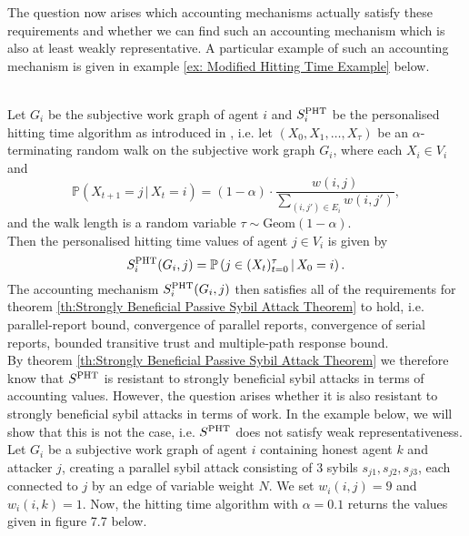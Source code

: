 \noindent{}The question now arises which accounting mechanisms actually satisfy these requirements and whether we can find such an accounting mechanism which is also at least weakly representative. A particular example of such an accounting mechanism is given in example \ref{ex: Modified Hitting Time Example} below.

\begin{example}[]\ \\
\label{ex: Modified Hitting Time Example}
\noindent{}Let $G_i$ be the subjective work graph of agent $i$ and $S^{\rm PHT}_i$ be the personalised hitting time algorithm as introduced in  \cite{Personalised Hitting Time}, i.e. let $(X_0,X_1,\ldots,X_{\tau})$ be an $\alpha$-terminating random walk on the subjective work graph $G_i$, where each $X_i\in{}V_i$ and 
\[
\mathbb{P}\left(X_{t+1}=j\,|\,X_t=i\right) = \left(1-\alpha\right)\cdot\frac{w(i,j)}{\sum\limits_{(i,j')\in{}E_i}w(i,j')},
\]
\noindent{}and the walk length is a random variable $\tau\sim$Geom$(1-\alpha)$. \vspace{1em}\\

\noindent{}Then the personalised hitting time values of agent $j\in{}V_i$ is given by 
\[
S^{\rm PHT}_i(G_i,j) = \mathbb{P}\left(j\in{}(X_t)_{t=0}^{\tau}\,|\,X_0=i\right).\vspace{1em}\\
\] 
\noindent{}The accounting mechanism $S^{\rm PHT}_i(G_i,j)$ then satisfies all of the requirements for theorem \ref{th:Strongly Beneficial Passive Sybil Attack Theorem} to hold, i.e. parallel-report bound, convergence of parallel reports, convergence of serial reports, bounded transitive trust and multiple-path response bound. \vspace{1em}\\

\noindent{}By theorem \ref{th:Strongly Beneficial Passive Sybil Attack Theorem} we therefore know that $S^{\rm PHT}$ is resistant to strongly beneficial sybil attacks in terms of accounting values. However, the question arises whether it is also resistant to strongly beneficial sybil attacks in terms of work. In the example below, we will show that this is not the case, i.e. $S^{\rm PHT}$ does not satisfy weak representativeness.\vspace{1em}\\

\noindent{}Let $G_i$ be a subjective work graph of agent $i$ containing honest agent $k$ and attacker $j$, creating a parallel sybil attack consisting of 3 sybils $s_{j1},s_{j2},s_{j3}$, each connected to $j$ by an edge of variable weight $N$. We set $w_i(i,j)=9$ and $w_i(i,k)=1$. Now, the hitting time algorithm with $\alpha=0.1$ returns the values given in figure 7.7 below.\vspace{1em}\\


\end{example}
